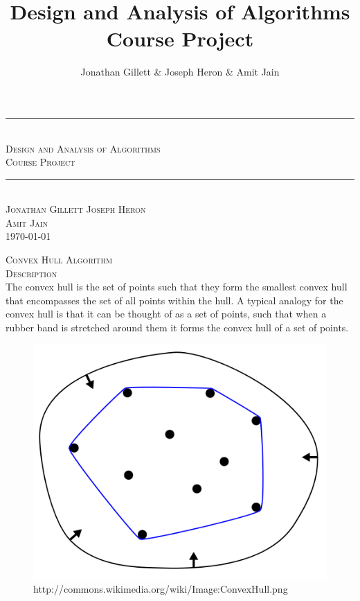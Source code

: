 \documentclass[pdftex,12pt,a4paper]{article}
\title{Design and Analysis of Algorithms Course Project}
\author{Jonathan Gillett \& Joseph Heron \& Amit Jain}
\newcommand{\HRule}{\rule{\linewidth}{0.5mm}}
\newcommand{\nspace}{\\[0.25cm]}
\newcommand{\Lspace}{\\[1.0cm]}
\begin{document}
\pagestyle{empty}
\begin{titlepage}
  		\newlength{\saveparindent}
		\setlength{\saveparindent}{\parindent}
		\setlength{\parindent}{0cm}
  		\sf
		\center
 
  		\HRule\\[0.60cm]
			\textsc{\Huge Design and Analysis of Algorithms}\\[0.25cm] 
			\textsc{\Huge Course Project}\\[0.50cm]
		\HRule\\[5cm]
		\textsc{\LARGE Jonathan Gillett \qquad Joseph Heron}\\[0.65cm]
		\textsc{\LARGE Amit Jain}\\[6.5cm]
		\textsc{\LARGE{}\today}\\

  		\setlength{\parindent}{\saveparindent}
\end{titlepage}


\flushleft


\textsc{\Huge Convex Hull Algorithm} \hfill \Lspace


\textsc{\Large Description} \hfill \nspace

The convex hull is the set of points such that they form the smallest convex hull that encompasses the set of all points within the hull. A typical analogy for the convex hull is that it can be thought of as a set of points, such that when a rubber band is stretched around them it forms the
convex hull of a set of points.

\begin{figure}[h!]
  \centering
	\includegraphics[scale=0.4]{img/convexhull_rubberband.png}
	\caption{http://commons.wikimedia.org/wiki/Image:ConvexHull.png}
\end{figure}
\end{document}
